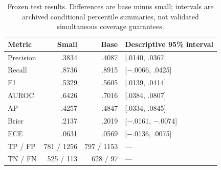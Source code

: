 \begin{table}[t]
\caption{Frozen test results. Differences are base minus small; intervals are archived conditional percentile summaries, not validated simultaneous coverage guarantees.}
\label{tab:test}\centering\footnotesize
\begin{tabular}{lrrl}\toprule
Metric & Small & Base & Descriptive 95\% interval\\\midrule
Precision & .3834 & .4087 & [.0140, .0367]\\
Recall & .8736 & .8915 & [$-$.0066, .0425]\\
F1 & .5329 & .5605 & [.0139, .0414]\\
AUROC & .6426 & .7016 & [.0384, .0807]\\
AP & .4257 & .4847 & [.0334, .0845]\\
Brier & .2137 & .2019 & [$-$.0161, $-$.0074]\\
ECE & .0631 & .0569 & [$-$.0136, .0075]\\\midrule
TP / FP & 781 / 1256 & 797 / 1153 & ---\\
TN / FN & 525 / 113 & 628 / 97 & ---\\\bottomrule
\end{tabular}
\end{table}
